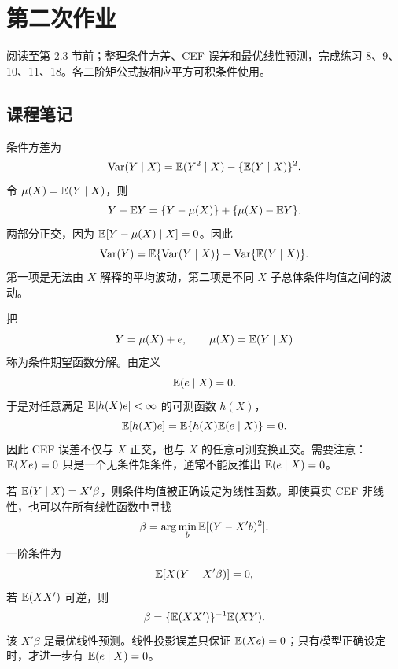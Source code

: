 \section{第二次作业}\label{hw:reg:assignment:2}

阅读至第 2.3 节前；整理条件方差、CEF 误差和最优线性预测，完成练习 8、9、10、11、18。各二阶矩公式按相应平方可积条件使用。

\subsection*{课程笔记}

\begin{proposition}\label{hw:reg:note:2:1}
条件方差为
\[
\operatorname{Var}(Y\mid X)=\mathbb{E}(Y^2\mid X)-\{\mathbb{E}(Y\mid X)\}^2.
\]
令 $\mu(X)=\mathbb{E}(Y\mid X)$，则
\[
Y-\mathbb{E} Y=\{Y-\mu(X)\}+\{\mu(X)-\mathbb{E} Y\}.
\]
两部分正交，因为 $\mathbb{E}[Y-\mu(X)\mid X]=0$。因此
\[
\operatorname{Var}(Y)=\mathbb{E}\{\operatorname{Var}(Y\mid X)\}
+\operatorname{Var}\{\mathbb{E}(Y\mid X)\}.
\]
第一项是无法由 $X$ 解释的平均波动，第二项是不同 $X$ 子总体条件均值之间的波动。
\end{proposition}

\begin{proposition}\label{hw:reg:note:2:2}
把
\[
Y=\mu(X)+e,\qquad \mu(X)=\mathbb{E}(Y\mid X)
\]
称为条件期望函数分解。由定义
\[
\mathbb{E}(e\mid X)=0.
\]
于是对任意满足 $\mathbb{E}|h(X)e|<\infty$ 的可测函数 $h(X)$，
\[
\mathbb{E}[h(X)e]=\mathbb{E}\{h(X)\mathbb{E}(e\mid X)\}=0.
\]
因此 CEF 误差不仅与 $X$ 正交，也与 $X$ 的任意可测变换正交。需要注意：$\mathbb{E}(Xe)=0$ 只是一个无条件矩条件，通常不能反推出 $\mathbb{E}(e\mid X)=0$。
\end{proposition}

\begin{proposition}\label{hw:reg:note:2:3}
若 $\mathbb{E}(Y\mid X)=X'\beta$，则条件均值被正确设定为线性函数。即使真实 CEF 非线性，也可以在所有线性函数中寻找
\[
\beta=\arg\min_b\mathbb{E}[(Y-X'b)^2].
\]
一阶条件为
\[
\mathbb{E}[X(Y-X'\beta)]=0,
\]
若 $\mathbb{E}(XX')$ 可逆，则
\[
\beta=\{\mathbb{E}(XX')\}^{-1}\mathbb{E}(XY).
\]
该 $X'\beta$ 是最优线性预测。线性投影误差只保证 $\mathbb{E}(Xe)=0$；只有模型正确设定时，才进一步有 $\mathbb{E}(e\mid X)=0$。
\end{proposition}


